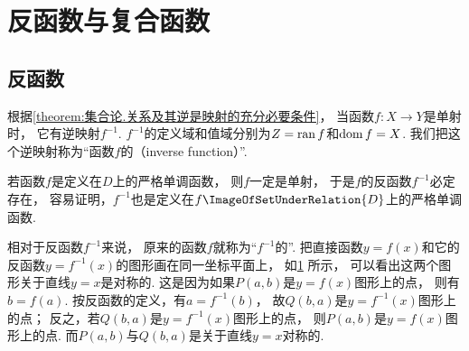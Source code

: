 \section{反函数与复合函数}
\subsection{反函数}
根据\cref{theorem:集合论.关系及其逆是映射的充分必要条件}，
当函数\(f\colon X \to Y\)是单射时，
它有逆映射\(f^{-1}\).
\(f^{-1}\)的定义域和值域分别为\(Z=\operatorname{ran} f\)和\(\operatorname{dom} f=X\).
我们把这个逆映射称为“函数\(f\)的（inverse function）”.

若函数\(f\)是定义在\(D\)上的严格单调函数，
则\(f\)一定是单射，
于是\(f\)的反函数\(f^{-1}\)必定存在，
容易证明，\(f^{-1}\)也是定义在\(f\ImageOfSetUnderRelation{D}\)上的严格单调函数.

相对于反函数\(f^{-1}\)来说，
原来的函数\(f\)就称为“\(f^{-1}\)的”.
把直接函数\(y=f(x)\)和它的反函数\(y=f^{-1}(x)\)的图形画在同一坐标平面上，
如\cref{figure:函数.直接函数与反函数的图形的对称性} 所示，
可以看出这两个图形关于直线\(y=x\)是对称的.
这是因为如果\(P(a,b)\)是\(y=f(x)\)图形上的点，
则有\(b=f(a)\).
按反函数的定义，有\(a=f^{-1}(b)\)，
故\(Q(b,a)\)是\(y=f^{-1}(x)\)图形上的点；
反之，若\(Q(b,a)\)是\(y=f^{-1}(x)\)图形上的点，
则\(P(a,b)\)是\(y=f(x)\)图形上的点.
而\(P(a,b)\)与\(Q(b,a)\)是关于直线\(y=x\)对称的.

\begin{figure}[htb]
	\centering
	\caption{}\label{figure:函数.直接函数与反函数的图形的对称性}
\end{figure}

